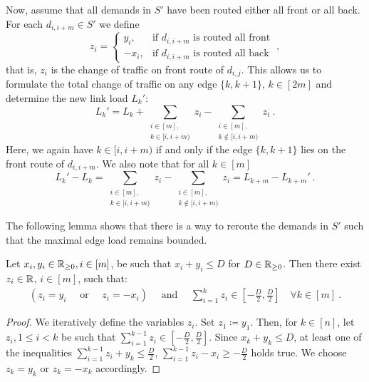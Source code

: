 Now, assume that all demands in $S'$ have been routed either all front or all back.
For each $d_{i, i+m} \in S'$ we define
\begin{equation}
	z_i = \begin{cases}
		y_i, &\text{if } d_{i, i+m} \text{ is routed all front} \\
		-x_i, &\text{if } d_{i, i+m} \text{ is routed all back}
	\end{cases} \ ,
\end{equation}
that is, $z_i$ is the change of traffic on front route of $d_{i, j}$.
This allows us to formulate the total change of traffic on any edge $\{k, k+1\}$, $k \in [2m]$ and determine the new link load $L_k'$:
\begin{equation}
	\label{eq:load-change}
	L_k' = L_k + \sum_{\substack{i \in [m],\\ k \in [i, i+m)}} z_i - \sum_{\substack{i \in [m],\\ k \notin[i, i+m)}} z_i \ .
\end{equation}
Here, we again have $k \in [i, i+m)$ if and only if the edge $\{k,k+1\}$ lies on the front route of $d_{i, i+m}$.
We also note that for all $k \in [m]$
\begin{equation}
	\label{eq:load-increase-equality}
	L_k' - L_k 
	= \sum_{\substack{i \in [m],\\ k \in [i, i+m)}} z_i - \sum_{\substack{i \in [m],\\ k \notin[i, i+m)}} z_i 
	= L_{k + m} - L_{k + m}' \ .
\end{equation}

The following lemma shows that there is a way to reroute the demands in $S'$ such that the maximal edge load remains bounded.
\begin{lemma}
	\label{lemma:reroute-demands}
	Let $x_i, y_i \in \mathbb{R}_{\geq 0}, i \in [m]$, be such that $x_i + y_i \leq D$ for $D \in \mathbb{R}_{\geq 0}$.
	Then there exist $z_i \in \mathbb{R}$, $i \in [m]$, such that:
	\begin{align}
		(z_i = y_i \quad \text{ or } \quad z_i = -x_i) 
		\quad \text{ and } \quad \sum_{i=1}^k z_i \in \left[-\frac{D}{2}, \frac{D}{2}\right] \quad \forall k \in [m] \ .
	\end{align}
\end{lemma}
\begin{proof}
	We iteratively define the variables $z_i$.
	Set $z_1 \coloneqq y_1$.
	Then, for $k \in [n]$, let $z_i, 1 \leq i < k$ be such that $\sum_{i=1}^{k-1} z_i \in \left[-\frac{D}{2}, \frac{D}{2}\right]$.
	Since $x_k + y_k \leq D$, at least one of the inequalities $\sum_{i=1}^{k-1} z_i + y_k \leq \frac{D}{2}$, $\sum_{i=1}^{k-1} z_i - x_i \geq -\frac{D}{2}$ holds true.
	We choose $z_k = y_k$ or $z_k = -x_k$ accordingly.	
\end{proof}

